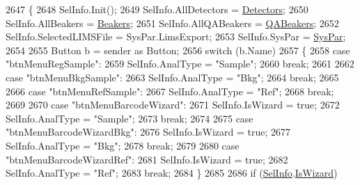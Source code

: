 \begin{DoxyCode}
2647         \{
2648             SelInfo.Init();
2649             SelInfo.AllDetectors = \hyperlink{class_scintilab_1_1_form_main_a88f16134102d9e4c5630adf5ff97f090}{Detectors};
2650             SelInfo.AllBeakers = \hyperlink{class_scintilab_1_1_form_main_aaff2cbfd906f576997bce08ece74dae8}{Beakers};
2651             SelInfo.AllQABeakers = \hyperlink{class_scintilab_1_1_form_main_af318208d55e4a144a14abde1adc7559d}{QABeakers};
2652             SelInfo.SelectedLIMSFile = SysPar.LimsExport;
2653             SelInfo.SysPar = \hyperlink{class_scintilab_1_1_form_main_ad41498eb151a72c77ad94c7285d0f506}{SysPar};
2654 
2655             Button b = sender as Button;
2656             \textcolor{keywordflow}{switch} (b.Name)
2657             \{
2658                 \textcolor{keywordflow}{case} \textcolor{stringliteral}{"btnMenuRegSample"}:
2659                     SelInfo.AnalType = \textcolor{stringliteral}{"Sample"};
2660                     \textcolor{keywordflow}{break};
2661 
2662                 \textcolor{keywordflow}{case} \textcolor{stringliteral}{"btnMenuBkgSample"}:
2663                     SelInfo.AnalType = \textcolor{stringliteral}{"Bkg"};
2664                     \textcolor{keywordflow}{break};
2665 
2666                 \textcolor{keywordflow}{case} \textcolor{stringliteral}{"btnMenuRefSample"}:
2667                     SelInfo.AnalType = \textcolor{stringliteral}{"Ref"};
2668                     \textcolor{keywordflow}{break};
2669 
2670                 \textcolor{keywordflow}{case} \textcolor{stringliteral}{"btnMenuBarcodeWizard"}:
2671                     SelInfo.IsWizard = \textcolor{keyword}{true};
2672                     SelInfo.AnalType = \textcolor{stringliteral}{"Sample"};
2673                     \textcolor{keywordflow}{break};
2674 
2675                 \textcolor{keywordflow}{case} \textcolor{stringliteral}{"btnMenuBarcodeWizardBkg"}:
2676                     SelInfo.IsWizard = \textcolor{keyword}{true};
2677                     SelInfo.AnalType = \textcolor{stringliteral}{"Bkg"};
2678                     \textcolor{keywordflow}{break};
2679 
2680                 \textcolor{keywordflow}{case} \textcolor{stringliteral}{"btnMenuBarcodeWizardRef"}:
2681                     SelInfo.IsWizard = \textcolor{keyword}{true};
2682                     SelInfo.AnalType = \textcolor{stringliteral}{"Ref"};
2683                     \textcolor{keywordflow}{break};
2684             \}
2685 
2686             \textcolor{keywordflow}{if} (\hyperlink{class_scintilab_1_1_form_main_a57c8340ae2caaec775ad70d8036514fb}{SelInfo}.\hyperlink{class_scintilab_1_1_selection_info_a96e2aa901380fdaf56f62adb7ed4a7c8}{IsWizard})

\end{DoxyCode}
